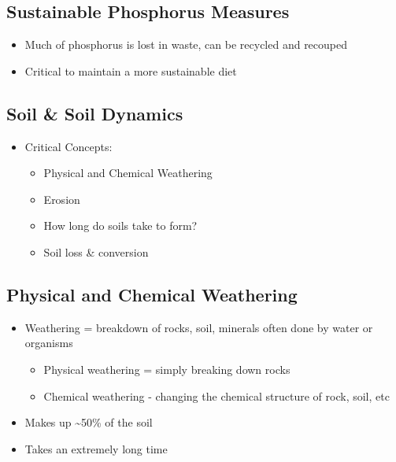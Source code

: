 \documentclass[11pt]{article}
\begin{document}
\subsection{Sustainable Phosphorus Measures}
\label{sec:org1928973}
\begin{itemize}
\item Much of phosphorus is lost in waste, can be recycled and recouped
\item Critical to maintain a more sustainable diet
\end{itemize}
\subsection{Soil \& Soil Dynamics}
\label{sec:orgb71cf56}
\begin{itemize}
\item Critical Concepts:
\begin{itemize}
\item Physical and Chemical Weathering
\item Erosion
\item How long do soils take to form?
\item Soil loss \& conversion
\end{itemize}
\end{itemize}
\subsection{Physical and Chemical Weathering}
\label{sec:org7d4d5a2}
\begin{itemize}
\item Weathering = breakdown of rocks, soil, minerals often done by water or organisms
\begin{itemize}
\item Physical weathering = simply breaking down rocks
\item Chemical weathering - changing the chemical structure of rock, soil, etc
\end{itemize}
\item Makes up \textasciitilde{}50\% of the soil
\item Takes an extremely long time
\end{itemize}
\end{document}
